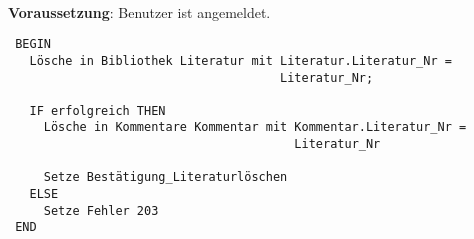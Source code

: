 \hrulefill\\
\textbf{Voraussetzung}: Benutzer ist angemeldet.
\begin{verbatim}
 BEGIN
   Lösche in Bibliothek Literatur mit Literatur.Literatur_Nr = 
                                      Literatur_Nr;

   IF erfolgreich THEN
     Lösche in Kommentare Kommentar mit Kommentar.Literatur_Nr = 
                                        Literatur_Nr

     Setze Bestätigung_Literaturlöschen
   ELSE
     Setze Fehler 203
 END
\end{verbatim}
\hrulefill